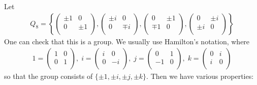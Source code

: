 \documentclass{../../template/note}
\begin{document}
    \begin{example}
        Let
        \begin{align*}
            Q_8 = \left\{\begin{pmatrix}
             \pm 1 & 0 \\
             0 & \pm 1 \\
            \end{pmatrix}, \begin{pmatrix}
             \pm i & 0 \\
             0 & \mp i \\
            \end{pmatrix}, \begin{pmatrix}
             0 & \pm 1 \\
             \mp 1 & 0 \\
            \end{pmatrix}, \begin{pmatrix}
             0 & \pm i \\
             \pm i & 0 \\
            \end{pmatrix}\right\}
        \end{align*}
        One can check that this is a group. We usually use Hamilton's notation, where
        \begin{align*}
            1 = \begin{pmatrix}
             1 & 0 \\
             0 & 1 \\
            \end{pmatrix},\;
            i = \begin{pmatrix}
             i & 0 \\
             0 & -i \\
            \end{pmatrix},\;
            j = \begin{pmatrix}
             0 & 1 \\
             -1 & 0 \\
            \end{pmatrix},\;
            k = \begin{pmatrix}
             0 & i \\
             i & 0 \\
            \end{pmatrix}
        \end{align*}
        so that the group consists of \(\{\pm 1, \pm i, \pm j, \pm k\}\). Then we have various properties:

\end{example}
\end{document}
